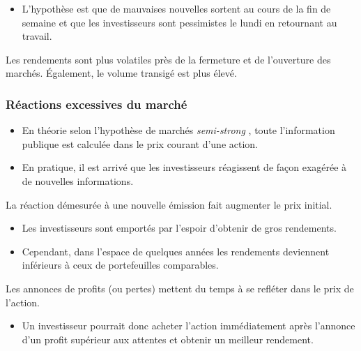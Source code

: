 \documentclass[10pt, french]{article}
\begin{document}
\begin{multicols*}{2}
\begin{definitionNOHFILLprop}
\begin{itemize}
	\item	L'hypothèse est que de mauvaises nouvelles sortent au cours de la fin de semaine et que les investisseurs sont pessimistes le lundi en retournant au travail.
\end{itemize}
\end{definitionNOHFILLprop}

\begin{definitionNOHFILLprop}
Les rendements sont plus volatiles près de la fermeture et de l'ouverture des marchés. Également, le volume transigé est plus élevé.
\end{definitionNOHFILLprop}

\subsubsection{Réactions excessives du marché}
\begin{itemize}
	\item	En théorie selon l'hypothèse de marchés \og \textit{semi-strong} \fg{}, toute l'information publique est calculée dans le prix courant d'une action. 
	\item	En pratique, il est arrivé que les investisseurs réagissent de façon exagérée à de nouvelles informations.
\end{itemize}

\begin{definitionNOHFILLprop}
La réaction démesurée à une nouvelle émission fait augmenter le prix initial. 

\begin{itemize}
	\item	Les investisseurs sont emportés par l'espoir d'obtenir de gros rendements.
	\item	Cependant, dans l'espace de quelques années les rendements deviennent inférieurs à ceux de portefeuilles comparables.
\end{itemize}
\end{definitionNOHFILLprop}

\begin{definitionNOHFILLprop}
Les annonces de profits (ou pertes) mettent du temps à se refléter dans le prix de l'action. 

\begin{itemize}
	\item	Un investisseur pourrait donc acheter l'action immédiatement après l'annonce d'un profit supérieur aux attentes et obtenir un meilleur rendement.
\end{itemize}
\end{definitionNOHFILLprop}


\end{multicols*}
\end{document}
